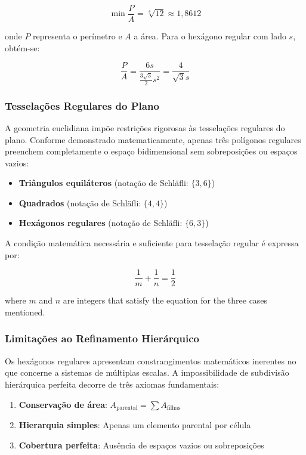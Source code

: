 \documentclass[12pt,a4paper,oneside]{extarticle}
\begin{document}
\begin{equation}
\min \frac{P}{A} = \sqrt[4]{12} \approx 1,8612
\label{eq:honeycomb_conjecture}
\end{equation}

onde $P$ representa o perímetro e $A$ a área. Para o hexágono regular com lado $s$, obtém-se:

\begin{equation}
\frac{P}{A} = \frac{6s}{\frac{3\sqrt{3}}{2}s^2} = \frac{4}{\sqrt{3}s}
\label{eq:hexagon_ratio}
\end{equation}

\subsubsection{Tesselações Regulares do Plano}
A geometria euclidiana impõe restrições rigorosas às tesselações regulares do plano. Conforme demonstrado matematicamente, apenas três polígonos regulares preenchem completamente o espaço bidimensional sem sobreposições ou espaços vazios:

\begin{itemize}
    \item \textbf{Triângulos equiláteros} (notação de Schläfli: $\{3,6\}$)
    \item \textbf{Quadrados} (notação de Schläfli: $\{4,4\}$) 
    \item \textbf{Hexágonos regulares} (notação de Schläfli: $\{6,3\}$)
\end{itemize}

A condição matemática necessária e suficiente para tesselação regular é expressa por:

\begin{equation}
\frac{1}{m} + \frac{1}{n} = \frac{1}{2}
\label{eq:tessellation_condition}
\end{equation}

where $m$ and $n$ are integers that satisfy the equation for the three cases mentioned.

\subsubsection{Limitações ao Refinamento Hierárquico}
Os hexágonos regulares apresentam constrangimentos matemáticos inerentes no que concerne a sistemas de múltiplas escalas. A impossibilidade de subdivisão hierárquica perfeita decorre de três axiomas fundamentais:

\begin{enumerate}
    \item \textbf{Conservação de área}: $A_{\text{parental}} = \sum A_{\text{filhas}}$
    \item \textbf{Hierarquia simples}: Apenas um elemento parental por célula
    \item \textbf{Cobertura perfeita}: Ausência de espaços vazios ou sobreposições
\end{enumerate}
\end{document}
